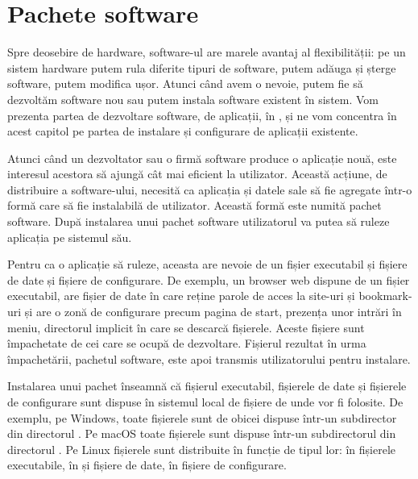 
\chapter{Pachete software}
\label{ch:package}

Spre deosebire de hardware, software-ul are marele avantaj al flexibilității: pe un sistem hardware putem rula diferite tipuri de software, putem adăuga și șterge software, putem modifica ușor.
Atunci când avem o nevoie, putem fie să dezvoltăm software nou sau putem instala software existent în sistem.
Vom prezenta partea de dezvoltare software, de aplicații, în , și ne vom concentra în acest capitol pe partea de instalare și configurare de aplicații existente.

Atunci când un dezvoltator sau o firmă software produce o aplicație nouă, este interesul acestora să ajungă cât mai eficient la utilizator.
Această acțiune, de distribuire a software-ului, necesită ca aplicația și datele sale să fie agregate într-o formă care să fie instalabilă de utilizator.
Această formă este numită pachet software.
După instalarea unui pachet software utilizatorul va putea să ruleze aplicația pe sistemul său.

Pentru ca o aplicație să ruleze, aceasta are nevoie de un fișier executabil și fișiere de date și fișiere de configurare.
De exemplu, un browser web dispune de un fișier executabil, are fișier de date în care reține parole de acces la site-uri și bookmark-uri și are o zonă de configurare precum pagina de start, prezența unor intrări în meniu, directorul implicit în care se descarcă fișierele.
Aceste fișiere sunt împachetate de cei care se ocupă de dezvoltare.
Fișierul rezultat în urma împachetării, pachetul software, este apoi transmis utilizatorului pentru instalare.

Instalarea unui pachet înseamnă că fișierul executabil, fișierele de date și fișierele de configurare sunt dispuse în sistemul local de fișiere de unde vor fi folosite.
De exemplu, pe Windows, toate fișierele sunt de obicei dispuse într-un subdirector din directorul .
Pe macOS toate fișierele sunt dispuse într-un subdirectorul din directorul .
Pe Linux fișierele sunt distribuite în funcție de tipul lor: în  fișierele executabile, în  și  fișiere de date, în  fișiere de configurare.

